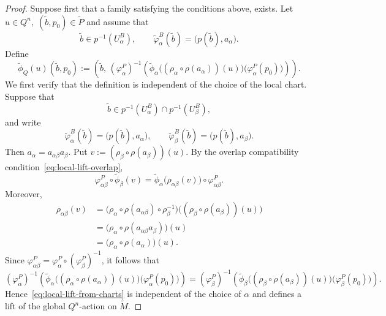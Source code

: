 \documentclass[11pt,a4paper]{article}
\numberwithin{equation}{section}
\theoremstyle{named}
\begin{document}
\begin{proof}
Suppose first that a family satisfying the conditions above, exists. Let $u\in Q^n,\;
(\widetilde b,p_0)\in\widetilde P$
and assume that
\[
\widetilde b\in p^{-1}(U_\alpha^B),
\qquad
\widetilde\varphi_\alpha^B(\widetilde b)
=
\bigl(p(\widetilde b),a_\alpha\bigr).
\]
Define
\begin{equation}
\label{eq:local-lift-from-charts}
\widetilde\phi_Q(u)(\widetilde b,p_0)
:=
\left(
\widetilde b,\,
(\varphi_\alpha^P)^{-1}
\left(
\widetilde\phi_\alpha
\bigl(
(\rho_\alpha\circ\rho(a_\alpha))(u)
\bigr)
\bigl(\varphi_\alpha^P(p_0)\bigr)
\right)
\right).
\end{equation}
We first verify that the definition is independent of the choice of the local chart. Suppose that
\[
\widetilde b \in p^{-1}(U_\alpha^B)\cap p^{-1}(U_\beta^B),
\]
and write
\[
\widetilde\varphi_\alpha^B(\widetilde b) = \bigl(p(\widetilde b),a_\alpha\bigr), \qquad \widetilde\varphi_\beta^B(\widetilde b) = \bigl(p(\widetilde b),a_\beta\bigr).
\]
Then $a_\alpha=a_{\alpha\beta}a_\beta$.
Put $v := (\rho_\beta\circ\rho(a_\beta))(u)$.
By the overlap compatibility condition~\eqref{eq:local-lift-overlap},
\[
\varphi_{\alpha\beta}^P\circ \widetilde\phi_\beta(v) = \widetilde\phi_\alpha\bigl(\rho_{\alpha\beta}(v)\bigr) \circ \varphi_{\alpha\beta}^P.
\]
Moreover,
\begin{align*}
\rho_{\alpha\beta}(v)
&=
\bigl(
\rho_\alpha\circ
\rho(a_{\alpha\beta})\circ
\rho_\beta^{-1}
\bigr)
\bigl(
(\rho_\beta\circ\rho(a_\beta))(u)
\bigr)
\\
&=
\bigl(
\rho_\alpha\circ
\rho(a_{\alpha\beta}a_\beta)
\bigr)(u)
\\
&=
\bigl(
\rho_\alpha\circ\rho(a_\alpha)
\bigr)(u).
\end{align*}
Since $\varphi_{\alpha\beta}^P
=
\varphi_\alpha^P\circ(\varphi_\beta^P)^{-1}$, it follows that
\[(\varphi_\alpha^P)^{-1}
\left(
\widetilde\phi_\alpha
\bigl(
(\rho_\alpha\circ\rho(a_\alpha))(u)
\bigr)
\bigl(\varphi_\alpha^P(p_0)\bigr)
\right)=
(\varphi_\beta^P)^{-1}
\left(
\widetilde\phi_\beta
\bigl(
(\rho_\beta\circ\rho(a_\beta))(u)
\bigr)
\bigl(\varphi_\beta^P(p_0)\bigr)
\right).\]
Hence~\eqref{eq:local-lift-from-charts} is independent of the choice of \(\alpha\) and defines a lift of the global \(Q^n\)-action on \(\widetilde M\).


\end{proof}
\end{document}

